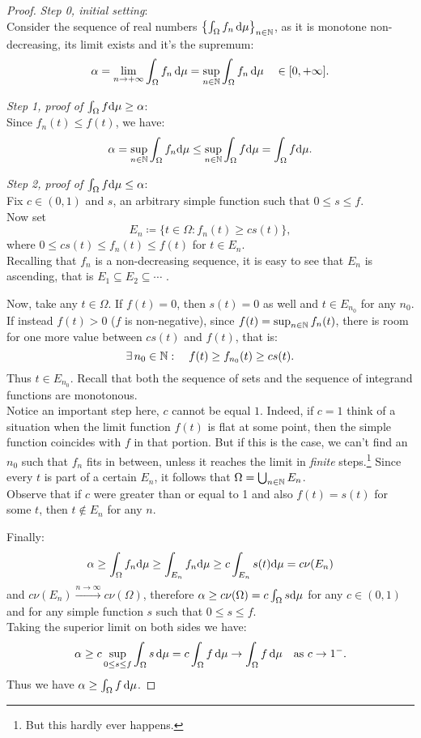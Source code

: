 \begin{proof}\textit{Step 0, initial setting}:\\
	Consider the sequence of real numbers $\left\{\int_\Omega f_n \, \mathrm d\mu\right\}_{n \in \mathbb N}$, as it is monotone non-decreasing, its limit exists and it's the supremum:
	$$
		\alpha 
		= \lim\limits_{n \to +\infty} \int_\Omega f_n \, \mathrm d\mu 
		= \sup\limits_{n \in \mathbb N} \int_\Omega f_n \,\mathrm d\mu 
		\quad \in [0,+\infty]
	.
	$$
	
	\textit{Step 1, proof of $\int_\Omega f \mathrm d\mu \ge\alpha$}:\\
	Since $f_n(t) \le f(t)$, we have:
	$$
		\alpha = \sup_{n \in \mathbb N} \int_\Omega f_n \mathrm d\mu \le \sup_{n \in \mathbb N} \int_\Omega f \mathrm d\mu = \int_\Omega f \mathrm d\mu.
	$$
	
	\textit{Step 2, proof of $\int_\Omega f \mathrm d\mu \le\alpha$}:\\
	Fix $c \in (0,1)$ and $s$, an arbitrary simple function such that $0 \le s \le f$. \\
	Now set 
	$$
		E_n 
		\coloneqq \{t \in \Omega : f_n(t) \ge c s(t)\}
	,
	$$
	where $0 \le c s(t) \le f_n(t) \le f(t)$ for $t \in E_n$.\\
	Recalling that $f_n$ is a non-decreasing sequence, it is easy to see that $E_n$ is ascending, that is $E_1 \subseteq E_2 \subseteq \cdots$ .
	
	Now, take any $t \in \Omega$. If $f(t)=0$, then $s(t)=0$ as well and $t \in E_{n_0}$ for any $n_0$.\\
	If instead $f(t)>0$ ($f$ is non-negative), since $f(t) = \sup_{n \in \mathbb N} f_n(t)$, there is room for one more value between $c s(t)$ and $f(t)$, that is:
	$$
		\exists\, n_0 \in \mathbb N :
		\quad  f(t) \geq f_{n_0}(t) \ge c s(t)
	.
	$$
	Thus $t \in E_{n_0}$. Recall that both the sequence of sets and the sequence of integrand functions are monotonous.\\
	Notice an important step here, $c$ cannot be equal $1$. Indeed, if $c=1$ think of a situation when the limit function $f(t)$ is flat at some point, then the simple function coincides with $f$ in that portion. But if this is the case, we can't find an $n_0$ such that $f_n$ fits in between, unless it reaches the limit in \textit{finite} steps.\footnote{But this hardly ever happens.}
	Since every $t$ is part of a certain $E_n$, it follows that $\Omega = \bigcup_{n \in \mathbb N} E_n$.\\
	Observe that if $c$ were greater than or equal to 1 and also $f(t) = s(t)$ for some $t$, then $t \notin E_n$ for any $n$.
	
	Finally:
	$$
		\alpha\ge\int_\Omega f_n \mathrm d\mu 
		\ge \int_{E_n} f_n \mathrm d\mu 
		\ge c \int_{E_n} s(t) \mathrm d\mu 
		= c \nu(E_n)
	$$ 
	and $c \nu(E_n) \xrightarrow{n\to\infty} c \nu(\Omega)$, therefore $\alpha \ge c 	\nu(\Omega) = c \int_{\Omega} s \mathrm d\mu$ for any $c \in (0,1)$ and for any simple function $s$ such that $0 \le s \le f$. \\
	Taking the superior limit on both sides we have:
	$$
		\alpha 
		\ge c \sup_{0 \le s \le f} \int_\Omega s \, \mathrm d\mu 
		= c \int_\Omega f \, \mathrm d\mu 
		\to \int_\Omega f \, \mathrm d\mu 
		\quad \text{as } c \to 1^-
	.
	$$
	Thus we have $\alpha \ge \int_\Omega f \, \mathrm d\mu$.
\end{proof}

